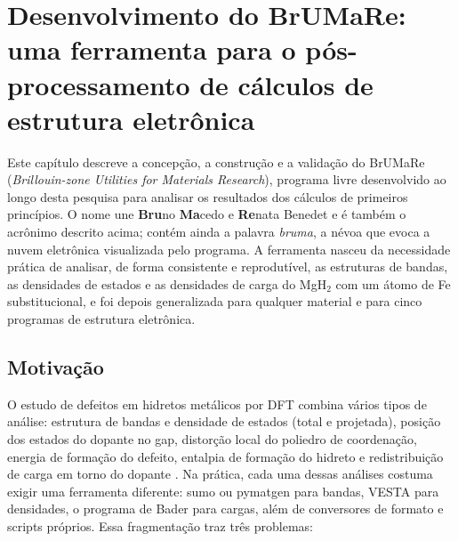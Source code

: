 \chapter{Desenvolvimento do BrUMaRe: uma ferramenta para o pós-processamento de cálculos de estrutura eletrônica}\label{cap:brumare}

Este capítulo descreve a concepção, a construção e a validação do \textsf{BrUMaRe} (\emph{Brillouin-zone Utilities for Materials Research}), programa livre desenvolvido ao longo desta pesquisa para analisar os resultados dos cálculos de primeiros princípios. O nome une \textbf{Bru}no \textbf{Ma}cedo e \textbf{Re}nata Benedet e é também o acrônimo descrito acima; contém ainda a palavra \emph{bruma}, a névoa que evoca a nuvem eletrônica visualizada pelo programa. A ferramenta nasceu da necessidade prática de analisar, de forma consistente e reprodutível, as estruturas de bandas, as densidades de estados e as densidades de carga do MgH$_2$ com um átomo de Fe substitucional, e foi depois generalizada para qualquer material e para cinco programas de estrutura eletrônica.

\section{Motivação}

O estudo de defeitos em hidretos metálicos por DFT \cite{hohenberg1964,kohn1965} combina vários tipos de análise: estrutura de bandas e densidade de estados (total e projetada), posição dos estados do dopante no gap, distorção local do poliedro de coordenação, energia de formação do defeito, entalpia de formação do hidreto e redistribuição de carga em torno do dopante \cite{sakintuna2007}. Na prática, cada uma dessas análises costuma exigir uma ferramenta diferente: sumo \cite{ganose2018sumo} ou pymatgen \cite{ong2013pymatgen} para bandas, VESTA \cite{momma2011vesta} para densidades, o programa de Bader \cite{henkelman2006} para cargas, além de conversores de formato e scripts próprios. Essa fragmentação traz três problemas:

